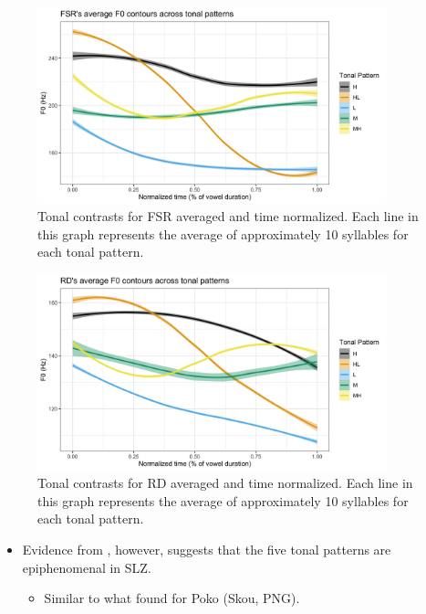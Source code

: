 \documentclass[12pt, letterpaper]{article}
\begin{document}
\begin{figure}[!ht]
	\centering
	\includegraphics[width=0.9\textwidth]{../FSRTonePlot.png}
	\caption{Tonal contrasts for FSR averaged and time normalized. Each line in this graph represents the average of approximately 10 syllables for each tonal pattern. }
	\label{fig:FSRTonePlot}
\end{figure}

\begin{figure}[!ht]
	\centering
	\includegraphics[width=0.9\textwidth]{../RDTonePlot.png}
	\caption{Tonal contrasts for RD averaged and time normalized. Each line in this graph represents the average of approximately 10 syllables for each tonal pattern.}
	\label{fig:RDTonePlot}
\end{figure}

\begin{itemize}
	\item Evidence from \citet{brinkerhoffDownstepSantiagoLaxopaMFM,brinkerhoffTonalPatternsTheir2022}, however, suggests that the five tonal patterns are epiphenomenal in SLZ.
	\begin{itemize}
		\item Similar to what \citet{mcphersonWordToneEpiphenomenal2022} found for Poko (Skou, PNG).
	\end{itemize}
\end{itemize}
\end{document}
